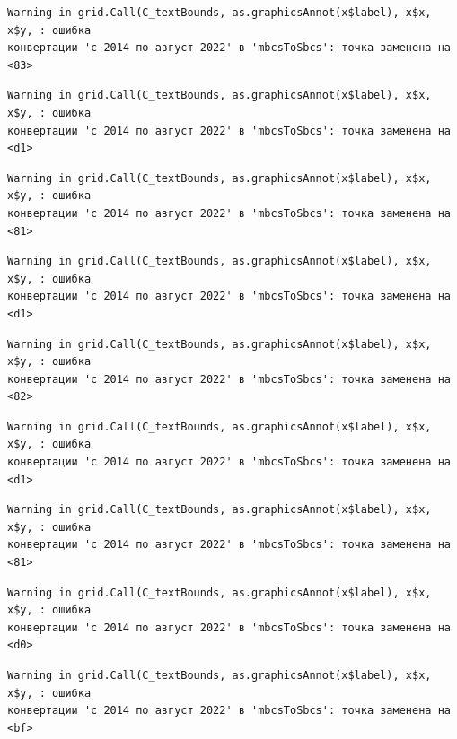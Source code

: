 \documentclass[
  letterpaper,
  DIV=11,
  numbers=noendperiod]{scrreprt}
\begin{document}
\begin{verbatim}
Warning in grid.Call(C_textBounds, as.graphicsAnnot(x$label), x$x, x$y, : ошибка
конвертации 'с 2014 по август 2022' в 'mbcsToSbcs': точка заменена на <83>
\end{verbatim}

\begin{verbatim}
Warning in grid.Call(C_textBounds, as.graphicsAnnot(x$label), x$x, x$y, : ошибка
конвертации 'с 2014 по август 2022' в 'mbcsToSbcs': точка заменена на <d1>
\end{verbatim}

\begin{verbatim}
Warning in grid.Call(C_textBounds, as.graphicsAnnot(x$label), x$x, x$y, : ошибка
конвертации 'с 2014 по август 2022' в 'mbcsToSbcs': точка заменена на <81>
\end{verbatim}

\begin{verbatim}
Warning in grid.Call(C_textBounds, as.graphicsAnnot(x$label), x$x, x$y, : ошибка
конвертации 'с 2014 по август 2022' в 'mbcsToSbcs': точка заменена на <d1>
\end{verbatim}

\begin{verbatim}
Warning in grid.Call(C_textBounds, as.graphicsAnnot(x$label), x$x, x$y, : ошибка
конвертации 'с 2014 по август 2022' в 'mbcsToSbcs': точка заменена на <82>
\end{verbatim}

\begin{verbatim}
Warning in grid.Call(C_textBounds, as.graphicsAnnot(x$label), x$x, x$y, : ошибка
конвертации 'с 2014 по август 2022' в 'mbcsToSbcs': точка заменена на <d1>
\end{verbatim}

\begin{verbatim}
Warning in grid.Call(C_textBounds, as.graphicsAnnot(x$label), x$x, x$y, : ошибка
конвертации 'с 2014 по август 2022' в 'mbcsToSbcs': точка заменена на <81>
\end{verbatim}

\begin{verbatim}
Warning in grid.Call(C_textBounds, as.graphicsAnnot(x$label), x$x, x$y, : ошибка
конвертации 'с 2014 по август 2022' в 'mbcsToSbcs': точка заменена на <d0>
\end{verbatim}

\begin{verbatim}
Warning in grid.Call(C_textBounds, as.graphicsAnnot(x$label), x$x, x$y, : ошибка
конвертации 'с 2014 по август 2022' в 'mbcsToSbcs': точка заменена на <bf>
\end{verbatim}
\end{document}
